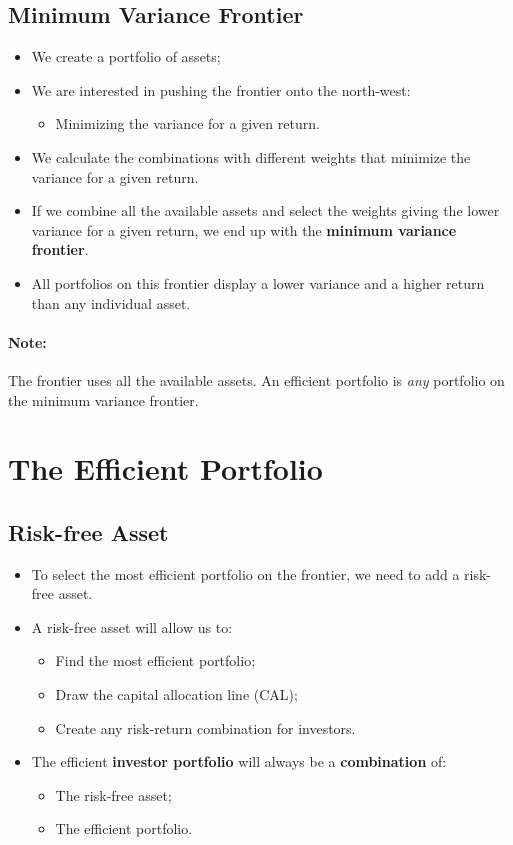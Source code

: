 \documentclass[11pt,a4paper]{report}
\begin{document}
\subsection{Minimum Variance Frontier}
\begin{itemize} 
    \item We create a portfolio of assets;
    \item We are interested in pushing the frontier onto the north-west: 
    \begin{itemize}
        \item Minimizing the variance for a given return.
    \end{itemize}
    \item We calculate the combinations with different weights that minimize the variance for a given return.
    \item If we combine all the available assets and select the weights giving the lower variance for a given return, we end up with the \textbf{minimum variance frontier}.
    \item All portfolios on this frontier display a lower variance and a higher return than any individual asset.
\end{itemize}
\paragraph{Note:} The frontier uses all the available assets.
An efficient portfolio is \textit{any} portfolio on the minimum variance frontier.

\section{The Efficient Portfolio}
\subsection{Risk-free Asset}
\begin{itemize}
    \item To select the most efficient portfolio on the frontier, we need to add a risk-free asset.
    \item A risk-free asset will allow us to:
    \begin{itemize}
        \item Find the most efficient portfolio;
        \item Draw the capital allocation line (CAL);
        \item Create any risk-return combination for investors.
    \end{itemize}
    \item The efficient \textbf{investor portfolio} will always be a \textbf{combination} of:
    \begin{itemize}
        \item The risk-free asset;
        \item The efficient portfolio.
    \end{itemize}
\end{itemize}
\end{document}
